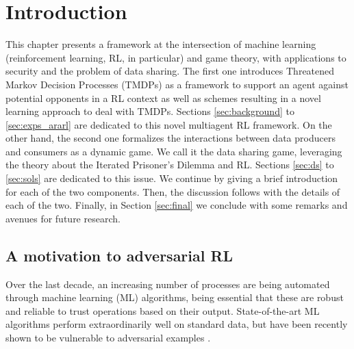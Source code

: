 \section{Introduction}

This chapter presents a framework at the intersection of machine learning (reinforcement learning, RL, in particular) and game theory, with applications to security and the problem of data sharing. 
The first one introduces Threatened Markov Decision Processes (TMDPs) 
as  a framework to support an agent against potential opponents
in a RL context as well as schemes 
resulting in a novel learning approach to deal with TMDPs. Sections \ref{sec:background} to \ref{sec:exps_ararl} are dedicated to this novel multiagent RL framework.
On the other hand, the second one formalizes the interactions between data producers and consumers as a dynamic game. We call it the data sharing game, leveraging the theory about the Iterated Prisoner's Dilemma and RL. Sections \ref{sec:ds} to \ref{sec:sols} are dedicated to this issue.
We continue by giving a brief introduction for each of the two components. Then, the discussion follows with the details of each of the two. Finally, in Section \ref{sec:final} we conclude with some remarks and avenues for future research.


\subsection{A motivation to adversarial RL}
Over the last decade,
an increasing number of processes are being automated through 
machine learning (ML) algorithms, being essential that these are robust and 
reliable to trust operations based on their output. State-of-the-art
ML algorithms perform extraordinarily well on standard data, but  
have been recently shown to be vulnerable to adversarial examples %
\parencite{goodfellow2014explaining}. 

